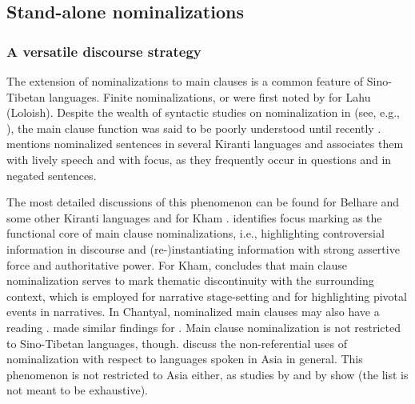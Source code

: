 \subsection{Stand-alone nominalizations}\label{nmlz-uni-3}
\subsubsection{A versatile discourse strategy}

The extension of nominalizations to main clauses is a common feature of Sino-Tibetan languages. Finite nominalizations, or  were first noted by \citet{Matisoff1972Lahu} for Lahu (Loloish). Despite the wealth of syntactic studies on nominalization in  (see, e.g., \citealt{Matisoff1972Lahu, Noonan1997Versatile, Noonan2008_Nominalization, DeLancey1999Relativization, DeLancey2002_Relativization, Genetti1992Semantic, Doornenbal2008_Nominalization, Genettietal2008_Nominalization, Watters2008_Nominalization, DeLancey2011_Finite}), the main clause function was said to be poorly understood until recently \citep[101]{Genettietal2008_Nominalization}. \citet[110]{Ebert1994The-structure} mentions nominalized sentences in several Kiranti languages and associates them with lively speech and with  focus, as they frequently occur  in questions and in negated sentences.

 The most detailed discussions of this phenomenon can be found for Belhare and some other Kiranti languages \citep{Bickel1999Nominalization} and for Kham \citep{Watters2002A-grammar}. \citet{Bickel1999Nominalization} identifies focus marking as the functional core of main clause nominalizations, i.e., highlighting controversial information in discourse and (re-)instantiating information with strong assertive force and authoritative power. For Kham, \citet[369]{Watters2002A-grammar} concludes that main clause nominalization serves to mark thematic discontinuity with the surrounding context, which is employed for narrative stage-setting and for highlighting pivotal events in narratives.  In Chantyal, nominalized main clauses may also have a  reading \citep{Noonan2008_Nominalization}. \citet[89]{Doornenbal2008_Nominalization} made similar findings for . Main clause nominalization is not restricted to Sino-Tibetan languages, though. \citet{Yapetal2010_Non-referential} discuss the non-referential uses of nominalization with respect to languages spoken in Asia in general. This phenomenon is not restricted to Asia either, as studies by \citet{Woodbury1985Noun} and by \citet{Wegener2012_Savosavo} show (the list is not meant to be exhaustive). 
 
